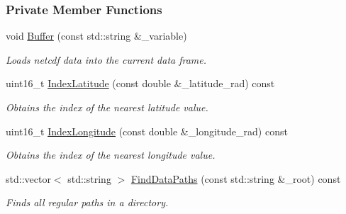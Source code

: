 \subsubsection*{Private Member Functions}
\begin{DoxyCompactItemize}
\item 
void \hyperlink{classosse_1_1collaborate_1_1_earth_data_a7a00924ea65a5ea68c25fbba2c1d3c9d}{Buffer} (const std\+::string \&\+\_\+variable)
\begin{DoxyCompactList}\small\item\em Loads netcdf data into the current data frame. \end{DoxyCompactList}\item 
uint16\+\_\+t \hyperlink{classosse_1_1collaborate_1_1_earth_data_a5c22945fb816aac16410d2641bba666c}{Index\+Latitude} (const double \&\+\_\+latitude\+\_\+rad) const
\begin{DoxyCompactList}\small\item\em Obtains the index of the nearest latitude value. \end{DoxyCompactList}\item 
uint16\+\_\+t \hyperlink{classosse_1_1collaborate_1_1_earth_data_affbe14ade774253ba546982953996574}{Index\+Longitude} (const double \&\+\_\+longitude\+\_\+rad) const
\begin{DoxyCompactList}\small\item\em Obtains the index of the nearest longitude value. \end{DoxyCompactList}\item 
std\+::vector$<$ std\+::string $>$ \hyperlink{classosse_1_1collaborate_1_1_earth_data_ab97521a1742be97c74a0aa538f8ad180}{Find\+Data\+Paths} (const std\+::string \&\+\_\+root) const
\begin{DoxyCompactList}\small\item\em Finds all regular paths in a directory. \end{DoxyCompactList}\end{DoxyCompactItemize}
